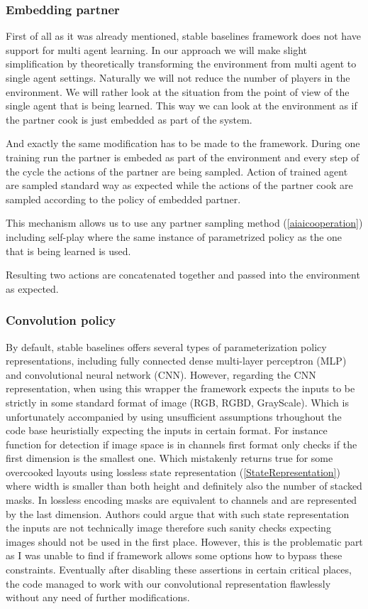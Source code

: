 \subsubsection*{Embedding partner}
First of all as it was already mentioned, stable baselines framework does not have support for multi agent learning.
In our approach we will make slight simplification by theoretically transforming the environment from multi agent to single agent settings.
Naturally we will not reduce the number of players in the environment.
We will rather look at the situation from the point of view of the single agent that is being learned. 
This way we can look at the environment as if the partner cook is just embedded as part of the system.

And exactly the same modification has to be made to the framework.
During one training run the partner is embeded as part of the environment and every step of the cycle the actions of the partner are being sampled.
Action of trained agent are sampled standard way as expected while the actions of the partner cook are sampled according to the policy of embedded partner.

This mechanism allows us to use any partner sampling method (\ref{aiaicooperation}) including self-play where the same instance of parametrized policy as the one that is being learned is used.

Resulting two actions are concatenated together and passed into the environment as expected.

\subsubsection*{Convolution policy}
By default, stable baselines offers several types of parameterization policy representations, including fully connected dense multi-layer perceptron (MLP) and convolutional neural network (CNN).
However, regarding the CNN representation, when using this wrapper the framework expects the inputs to be strictly in some standard format of image (RGB, RGBD, GrayScale).
Which is unfortunately accompanied by using unsufficient assumptions trhoughout the code base heuristially expecting the inputs in certain format.
For instance function for detection if image space is in channels first format only checks if the first dimension is the smallest one.
Which mistakenly returns true for some overcooked layouts using lossless state representation (\ref{StateRepresentation}) where width is smaller than both height and definitely also the number of stacked masks.
In lossless encoding masks are equivalent to channels and are represented by the last dimension.
Authors could argue that with such state representation the inputs are not technically image therefore such sanity checks expecting images should not be used in the first place.
However, this is the problematic part as I was unable to find if framework allows some options how to bypass these constraints.
Eventually after disabling these assertions in certain critical places, the code managed to work with our convolutional representation flawlessly without any need of further modifications.  


